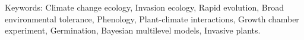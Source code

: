 \documentclass[11pt]{article}\usepackage[]{graphicx}\usepackage[]{color}
\begin{document}
\begin{abstract}
	\end{abstract}
Keywords: Climate change ecology, Invasion ecology, Rapid evolution, Broad environmental tolerance, Phenology, Plant-climate interactions, Growth chamber experiment, Germination, Bayesian multilevel models, Invasive plants.
\end{document}
